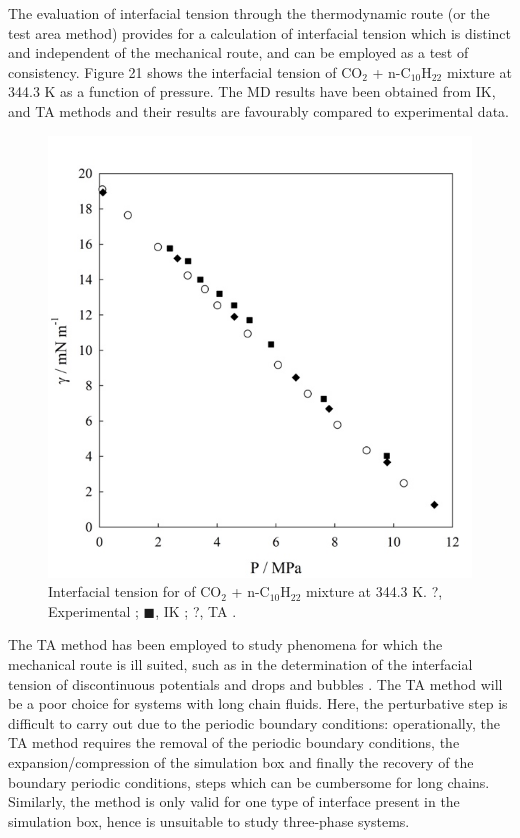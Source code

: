 \documentclass[9pt,bestpractices]{livecoms}
\begin{document}
The evaluation of interfacial tension through the thermodynamic route (or the
test area method) provides for a calculation of interfacial tension which is
distinct and independent of the mechanical route, and can be employed as a test
of consistency. Figure 21 shows the interfacial tension of CO$_{2}$
+ n-C$_{10}$H$_{22}$ mixture at 344.3 K as a function of pressure. The MD
results have been obtained from IK, and TA methods and their results are
favourably compared to experimental data.
\begin{figure}
\includegraphics[width=0.8\linewidth]{gfx/image67.jpeg}
\caption{Interfacial tension for of CO$_{2}$ + n-C$_{10}$H$_{22}$ mixture at 344.3 K. ?, Experimental \citep{mejia2014a}; ${\blacksquare}$, IK \citep{mejia2014a}; ?, TA \citep{muller2009} .}
\label{fig:21}
\end{figure}
The TA method has been employed to study phenomena for which the mechanical route
is ill suited, such as in the determination of the interfacial tension of
discontinuous potentials \citep{gloor2005}
and drops and bubbles \citep{sampayo2010}. The TA method will be a poor choice
for systems with long chain fluids. Here, the perturbative step is difficult to
carry out due to the periodic boundary conditions: operationally, the TA method
requires the removal of the periodic boundary conditions, the
expansion/compression of the simulation box and finally the recovery of the
boundary periodic conditions, steps which can be cumbersome for long chains.
Similarly, the method is only valid for one type of interface present in the
simulation box, hence is unsuitable to study three-phase systems. 
\end{document}

